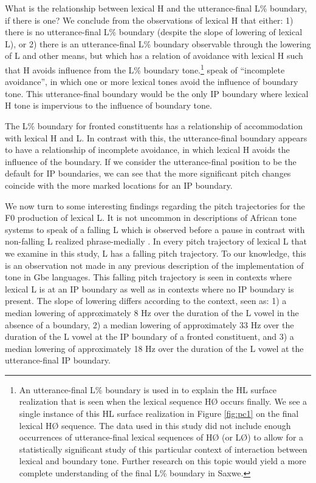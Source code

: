 \documentclass[
  11pt,
  b5paper,
]{article}
\begin{document}
What is the relationship between lexical H and the utterance-final L\%
boundary, if there is one? We conclude from the observations of lexical
H that either: 1) there is no utterance-final L\% boundary (despite the
slope of lowering of lexical L), or 2) there is an utterance-final L\%
boundary observable through the lowering of L and other means, but which
has a relation of avoidance with lexical H such that H avoids influence
from the L\% boundary tone.\footnote{An utterance-final L\% boundary is
  used in \textcite{Beavon-Ham2019Tone} to explain the HL surface
  realization that is seen when the lexical sequence HØ occurs finally.
  We see a single instance of this HL surface realization in Figure
  \ref{fig:pc1} on the final lexical HØ sequence. The data used in this
  study did not include enough occurrences of utterance-final lexical
  sequences of HØ (or LØ) to allow for a statistically significant study
  of this particular context of interaction between lexical and boundary
  tone. Further research on this topic would yield a more complete
  understanding of the final L\% boundary in Saxwe.}
\textcite{hyman_tonal_2011} speak of ``incomplete avoidance'', in which
one or more lexical tones avoid the influence of boundary tone. This
utterance-final boundary would be the only IP boundary where lexical H
tone is impervious to the influence of boundary tone.

The L\% boundary for fronted constituents has a relationship of
accommodation with lexical H and L. In contrast with this, the
utterance-final boundary appears to have a relationship of incomplete
avoidance, in which lexical H avoids the influence of the boundary. If
we consider the utterance-final position to be the default for IP
boundaries, we can see that the more significant pitch changes coincide
with the more marked locations for an IP boundary.

We now turn to some interesting findings regarding the pitch
trajectories for the F0 production of lexical L. It is not uncommon in
descriptions of African tone systems to speak of a falling L which is
observed before a pause in contrast with non-falling L realized
phrase-medially \autocite[pp.~175,230]{snider_tone_2018}. In every pitch
trajectory of lexical L that we examine in this study, L has a falling
pitch trajectory. To our knowledge, this is an observation not made in
any previous description of the implementation of tone in Gbe languages.
This falling pitch trajectory is seen in contexts where lexical L is at
an IP boundary as well as in contexts where no IP boundary is present.
The slope of lowering differs according to the context, seen as: 1) a
median lowering of approximately 8 Hz over the duration of the L vowel
in the absence of a boundary, 2) a median lowering of approximately 33
Hz over the duration of the L vowel at the IP boundary of a fronted
constituent, and 3) a median lowering of approximately 18 Hz over the
duration of the L vowel at the utterance-final IP boundary.
\end{document}
